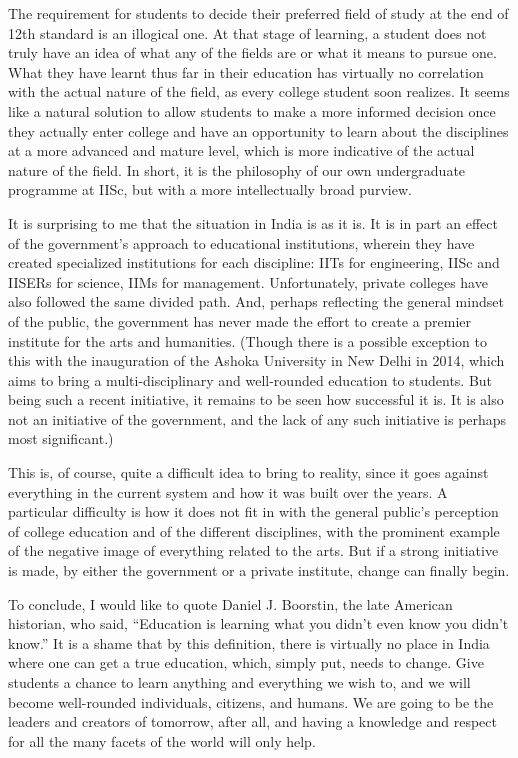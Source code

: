 \documentclass[11pt,a4paper]{article}
\begin{document}
The requirement for students to decide their preferred field of study at the end of 12th standard is an illogical one. At that stage of learning, a student does not truly have an idea of what any of the fields are or what it means to pursue one. What they have learnt thus far in their education has virtually no correlation with the actual nature of the field, as every college student soon realizes. It seems like a natural solution to allow students to make a more informed decision once they actually enter college and have an opportunity to learn about the disciplines at a more advanced and mature level, which is more indicative of the actual nature of the field. In short, it is the philosophy of our own undergraduate programme at IISc, but with a more intellectually broad purview.

It is surprising to me that the situation in India is as it is. It is in part an effect of the government's approach to educational institutions, wherein they have created specialized institutions for each discipline: IITs for engineering, IISc and IISERs for science, IIMs for management. Unfortunately, private colleges have also followed the same divided path. And, perhaps reflecting the general mindset of the public, the government has never made the effort to create a premier institute for the arts and humanities. (Though there is a possible exception to this with the inauguration of the Ashoka University in New Delhi in 2014, which aims to bring a multi-disciplinary and well-rounded education to students. But being such a recent initiative, it remains to be seen how successful it is. It is also not an initiative of the government, and the lack of any such initiative is perhaps most significant.)

This is, of course, quite a difficult idea to bring to reality, since it goes against everything in the current system and how it was built over the years. A particular difficulty is how it does not fit in with the general public's perception of college education and of the different disciplines, with the prominent example of the negative image of everything related to the arts. But if a strong initiative is made, by either the government or a private institute, change can finally begin.

To conclude, I would like to quote Daniel J. Boorstin, the late American historian, who said, ``Education is learning what you didn't even know you didn't know.'' It is a shame that by this definition, there is virtually no place in India where one can get a true education, which, simply put, needs to change. Give students a chance to learn anything and everything we wish to, and we will become well-rounded individuals, citizens, and humans. We are going to be the leaders and creators of tomorrow, after all, and having a knowledge and respect for all the many facets of the world will only help.





\vspace{0.75cm}


\begin{center}
\end{center}
\end{document}
